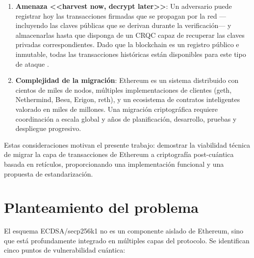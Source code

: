 \begin{enumerate}[label=\arabic*.]
  \item \textbf{Amenaza <<harvest now, decrypt later>>}: Un adversario puede registrar hoy las transacciones firmadas que se propagan por la red ---incluyendo las claves públicas que se derivan durante la verificación--- y almacenarlas hasta que disponga de un CRQC capaz de recuperar las claves privadas correspondientes. Dado que la blockchain es un registro público e inmutable, todas las transacciones históricas están disponibles para este tipo de ataque \parencite{quantumresistance2023nature}.
  
  \item \textbf{Complejidad de la migración}: Ethereum es un sistema distribuido con cientos de miles de nodos, múltiples implementaciones de clientes (geth, Nethermind, Besu, Erigon, reth), y un ecosistema de contratos inteligentes valorado en miles de millones. Una migración criptográfica requiere coordinación a escala global y años de planificación, desarrollo, pruebas y despliegue progresivo.
\end{enumerate}

Estas consideraciones motivan el presente trabajo: demostrar la viabilidad técnica de migrar la capa de transacciones de Ethereum a criptografía post-cuántica basada en retículos, proporcionando una implementación funcional y una propuesta de estandarización.


\section{Planteamiento del problema}

El esquema ECDSA/secp256k1 no es un componente aislado de Ethereum, sino que está profundamente integrado en múltiples capas del protocolo. Se identifican cinco puntos de vulnerabilidad cuántica:

